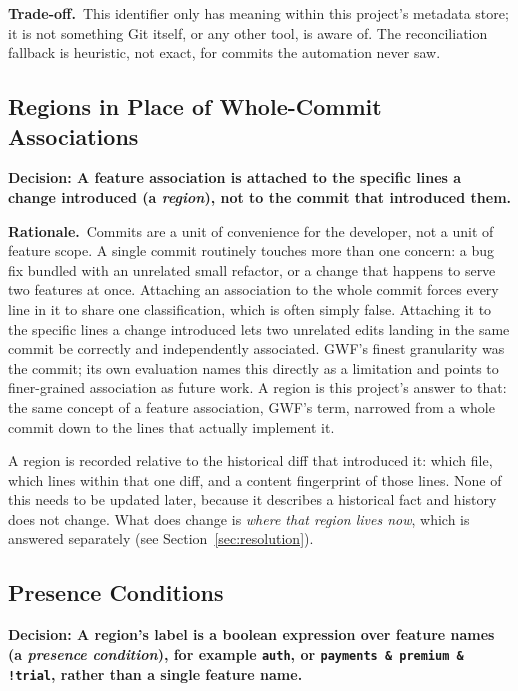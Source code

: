 \documentclass[11pt]{article}
\newcommand{\decision}[1]{\medskip\noindent\textbf{Decision: #1}\par\nopagebreak\smallskip}
\newcommand{\rationale}{\noindent\textbf{Rationale.}\ }
\newcommand{\tradeoff}{\noindent\textbf{Trade-off.}\ }
\begin{document}
\tradeoff This identifier only has meaning within this project's
metadata store; it is not something Git itself, or any other tool, is
aware of. The reconciliation fallback is heuristic, not exact, for commits
the automation never saw.

\subsection{Regions in Place of Whole-Commit Associations}
\label{sec:regions}

\decision{A feature association is attached to the specific lines a
change introduced (a \emph{region}), not to the commit that introduced
them.}

\rationale Commits are a unit of convenience for the developer, not a
unit of feature scope. A single commit routinely touches more than one
concern: a bug fix bundled with an unrelated small refactor, or a change
that happens to serve two features at once. Attaching an association to
the whole commit forces every line in it to share one classification,
which is often simply false. Attaching it to the specific lines a change
introduced lets two unrelated edits landing in the same commit be
correctly and independently associated. GWF's finest granularity was the
commit; its own evaluation names this directly as a limitation and points
to finer-grained association as future work. A region is this project's
answer to that: the same concept of a feature association, GWF's term,
narrowed from a whole commit down to the lines that actually implement it.

A region is recorded relative to the historical diff that introduced it:
which file, which lines within that one diff, and a content fingerprint of
those lines. None of this needs to be updated later, because it describes
a historical fact and history does not change. What does change is
\emph{where that region lives now}, which is answered separately (see
Section~\ref{sec:resolution}).

\subsection{Presence Conditions}
\label{sec:presence}

\decision{A region's label is a boolean expression over feature names (a
\emph{presence condition}), for example \texttt{auth}, or
\texttt{payments \& premium \& !trial}, rather than a single feature
name.}
\end{document}
